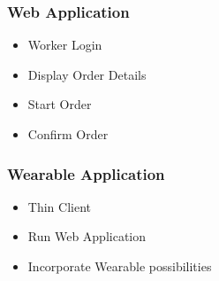 \begin{frame}\frametitle{Web Application}
	\begin{itemize}
		\item Worker Login
		\item Display Order Details
		\item Start Order
		\item Confirm Order
	\end{itemize}
\end{frame}
\begin{frame}\frametitle{Wearable Application}
	\begin{itemize}
		\item Thin Client
		\item Run Web Application
		\item Incorporate Wearable possibilities
	\end{itemize}
\end{frame}